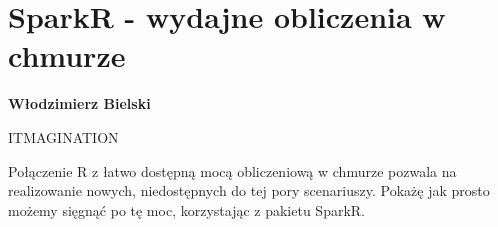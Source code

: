 \documentclass[\main/boa.tex]{subfiles}
\begin{document}
\section{SparkR - wydajne obliczenia w chmurze}

\begin{minipage}{0.915\textwidth}
	\centering
  {\bf {} Włodzimierz Bielski}
\end{minipage}

\vskip 0.3cm

\begin{affiliations}
\begin{minipage}{0.915\textwidth}
\centering
ITMAGINATION  \\[-2pt]
\end{minipage}
\end{affiliations}

\vskip 0.8cm

 Połączenie R z łatwo dostępną mocą obliczeniową w chmurze pozwala na realizowanie nowych, niedostępnych do tej pory scenariuszy. Pokażę jak prosto możemy sięgnąć po tę moc, korzystając z pakietu SparkR. 
\end{document}
